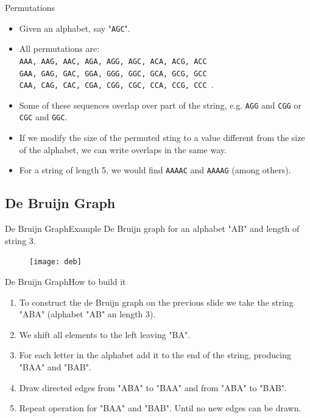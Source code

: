 \documentclass[hyperref={colorlinks=true}]{beamer}
\begin{document}
\begin{frame}{Permutations}
  \begin{itemize}
    \item[] Given an alphabet, say "\texttt{AGC}".
    \item[] All \alert{permutations} are:\\
\texttt{AAA, AAG, AAC, AGA, AGG, AGC, ACA, ACG, ACC \\
        GAA, GAG, GAC, GGA, GGG, GGC, GCA, GCG, GCC \\
        CAA, CAG, CAC, CGA, CGG, CGC, CCA, CCG, CCC }.
    \item[] Some of these sequences \alert{overlap} over part of the string,
e.g. \texttt{AGG} and \texttt{CGG} or \texttt{CGC} and \texttt{GGC}.
      \pause
    \item[] If we modify the size of the permuted sting to a value different
from the size of the alphabet, we can write \alert{overlaps} in the same way.
    \item[] For a string of length 5, we would find \texttt{AAAAC} and
\texttt{AAAAG} (among others).
  \end{itemize}
\end{frame}

\subsection{De Bruijn Graph}
\begin{frame}{De Bruijn Graph}{Example}
  De Bruijn graph for an alphabet "AB" and length of string 3.
  \begin{figure}
    \centering
    \texttt{[image: deb]}
  \end{figure}
\end{frame}

\begin{frame}{De Bruijn Graph}{How to build it}
  \begin{enumerate}
    \item To construct the de Bruijn graph on the previous slide we take the
string "ABA" (alphabet "AB" an length 3).
    \item We \alert{shift} all elements to the \alert{left} leaving "BA".
    \item For \alert{each letter} in the alphabet add it to the end of the
string, producing "BAA" and "BAB".
    \item Draw \alert{directed edges} from "ABA" to "BAA" and from "ABA" to "BAB".
    \item Repeat operation for "BAA" and "BAB".  Until no new edges can be
drawn.
  \end{enumerate}
\end{frame}
\end{document}
